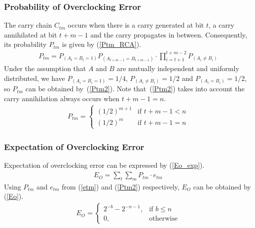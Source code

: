 \documentclass[journal]{IEEEtran}
\begin{document}
\subsubsection{Probability of Overclocking Error}
The carry chain $C_{tm}$ occurs when there is a carry generated at bit $t$, a carry annihilated at bit $t+m-1$ and the carry propagates in between. Consequently, its probability $P_{tm}$ is given by (\ref{Ptm_RCA}).
%
\begin{eqnarray}\label{Ptm_RCA}
  P_{tm}=P_{(A_t=B_t=1)}P_{(A_{t+m-1}=B_{t+m-1})}\cdot \prod_{i=t+1}^{t+m-2}P_{(A_i\neq B_i)}
\end{eqnarray}
Under the assumption that $A$ and $B$ are mutually independent and uniformly distributed, we have $P_{(A_i=B_i=1)}=1/4$, $P_{(A_i\neq B_i)}=1/2$ and $P_{(A_i=B_i)}=1/2$, so $P_{tm}$ can be obtained by~(\ref{Ptm2}). Note that~(\ref{Ptm2}) takes into account the carry annihilation always occurs when $t+m-1=n$.
%
\begin{eqnarray}\label{Ptm2}
    P_{tm}=\left\{\begin{array}{ll}
      (1/2)^{m+1} & \textrm{if $t+m-1<n$}\\
      (1/2)^{m} & \textrm{if $t+m-1=n$}
    \end{array} \right.
\end{eqnarray}

\subsubsection{Expectation of Overclocking Error}
Expectation of overclocking error can be expressed by (\ref{Eo_exp}).
%
\begin{eqnarray}\label{Eo_exp}
    E_O=\sum_{t}\sum_{m}P_{tm}\cdot e_{tm}
\end{eqnarray}
%
Using $P_{tm}$ and $e_{tm}$ from (\ref{etm}) and (\ref{Ptm2}) respectively, $E_O$ can be obtained by (\ref{Eo}).
\begin{eqnarray}\label{Eo}
      E_O=\left\{
        \begin{matrix}
            2^{-b}-2^{-n-1}, & \textrm{if $b\leq n$}\\
            0, & \textrm{otherwise}
        \end{matrix}
      \right.
\end{eqnarray}
\end{document}

